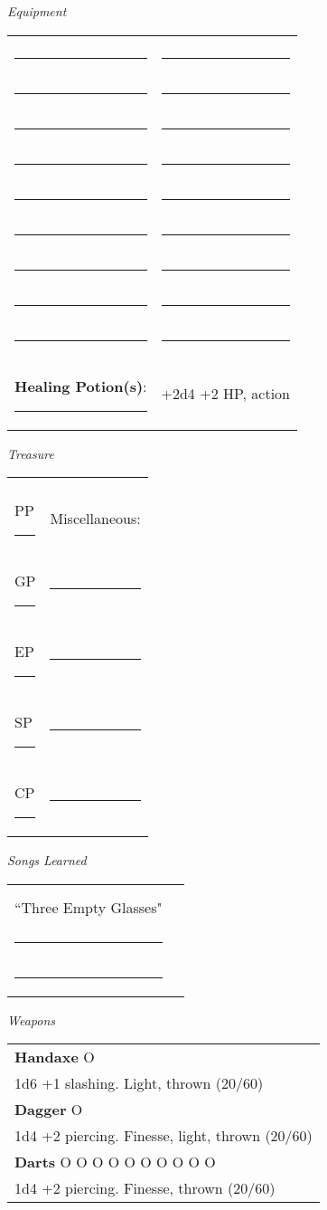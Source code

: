 \documentclass[letterpaper,10pt,twoside,twocolumn,openany]{book}
\begin{document}
{\Large{\textit{Equipment}}}\\
\begin{tabular}{|ll|}
\hline&\\
\rule{1.4in}{.2pt}&\rule{1.4in}{.2pt}\\
\rule{1.4in}{.2pt}&\rule{1.4in}{.2pt}\\
\rule{1.4in}{.2pt}&\rule{1.4in}{.2pt}\\
\rule{1.4in}{.2pt}&\rule{1.4in}{.2pt}\\
\rule{1.4in}{.2pt}&\rule{1.4in}{.2pt}\\
\rule{1.4in}{.2pt}&\rule{1.4in}{.2pt}\\
\rule{1.4in}{.2pt}&\rule{1.4in}{.2pt}\\
\rule{1.4in}{.2pt}&\rule{1.4in}{.2pt}\\
\rule{1.4in}{.2pt}&\rule{1.4in}{.2pt}\\
\textbf{Healing Potion(s)}: \rule{.2in}{.2pt}& +2d4 +2 HP, {\sc action}\\
\hline
\end{tabular}
\vspace{12pt}


{\Large{\textit{Treasure}}}\\
\begin{tabular}{|ll|}
\hline&\\
PP \rule{.5in}{.2pt} &Miscellaneous:\\
GP \rule{.5in}{.2pt} &\rule{2.2in}{.2pt}\\
EP \rule{.5in}{.2pt} &\rule{2.2in}{.2pt}\\
SP \rule{.5in}{.2pt} &\rule{2.2in}{.2pt}\\
CP \rule{.5in}{.2pt} &\rule{2.2in}{.2pt}\\
\hline
\end{tabular}
\vspace{12pt}

{\Large{\textit{Songs Learned}}}\\
\begin{tabular}{|ll|}
\hline&\\
``Three Empty Glasses"&\rule{1.5in}{.2pt}\\
\rule{1.45in}{.2pt}&\rule{1.5in}{.2pt}\\
\rule{1.45in}{.2pt}&\rule{1.5in}{.2pt}\\
\hline
\end{tabular}

\vspace{40pt}

{\Large{\textit{Weapons}}}\\
\begin{tabular}{|m{3.1in}|}
\hline
\textbf{Handaxe} O\\
1d6 +1 slashing. Light, thrown (20/60)\\
\textbf{Dagger} O\\
1d4 +2 piercing. Finesse, light, thrown (20/60)\\
\textbf{Darts} O O O O O O O O O O\\
1d4 +2 piercing. Finesse, thrown (20/60)\\

\hline
\end{tabular}
\vspace{8pt}
\end{document}
